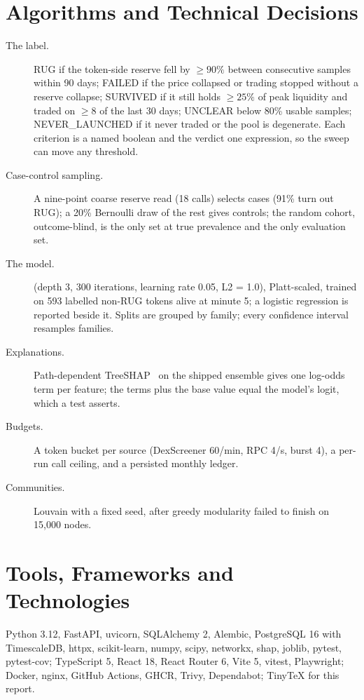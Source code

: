 \section{Algorithms and Technical Decisions}
\begin{description}
  \item[The label.] RUG if the token-side reserve fell by $\geq 90\%$ between consecutive samples within 90 days; FAILED if the price collapsed or trading stopped without a reserve collapse; SURVIVED if it still holds $\geq 25\%$ of peak liquidity and traded on $\geq 8$ of the last 30 days; UNCLEAR below 80\% usable samples; NEVER\_LAUNCHED if it never traded or the pool is degenerate. Each criterion is a named boolean and the verdict one expression, so the sweep can move any threshold.
  \item[Case-control sampling.] A nine-point coarse reserve read (18 calls) selects cases (91\% turn out RUG); a 20\% Bernoulli draw of the rest gives controls; the random cohort, outcome-blind, is the only set at true prevalence and the only evaluation set.
  \item[The model.]  (depth 3, 300 iterations, learning rate 0.05, L2 = 1.0), Platt-scaled, trained on 593 labelled non-RUG tokens alive at minute 5; a logistic regression is reported beside it. Splits are grouped by family; every confidence interval resamples families.
  \item[Explanations.] Path-dependent TreeSHAP~\cite{lundberg2020} on the shipped ensemble gives one log-odds term per feature; the terms plus the base value equal the model's logit, which a test asserts.
  \item[Budgets.] A token bucket per source (DexScreener 60/min, RPC 4/s, burst 4), a per-run call ceiling, and a persisted monthly ledger.
  \item[Communities.] Louvain with a fixed seed, after greedy modularity failed to finish on 15,000 nodes.
\end{description}

\section{Tools, Frameworks and Technologies}
Python 3.12, FastAPI, uvicorn, SQLAlchemy 2, Alembic, PostgreSQL 16 with TimescaleDB, httpx, scikit-learn, numpy, scipy, networkx, shap, joblib, pytest, pytest-cov; TypeScript 5, React 18, React Router 6, Vite 5, vitest, Playwright; Docker, nginx, GitHub Actions, GHCR, Trivy, Dependabot; TinyTeX for this report.

